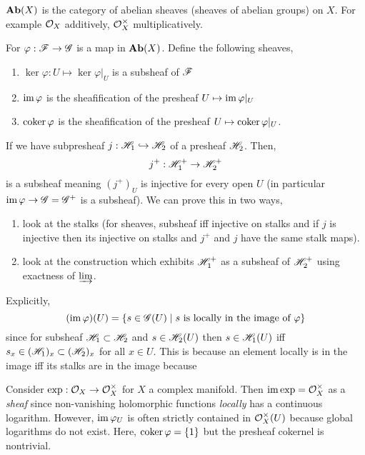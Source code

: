 \documentclass[12pt]{article}
\begin{document}
\begin{defn}
$\mathbf{Ab}(X)$ is the category of abelian sheaves (sheaves of abelian groups) on $X$. For example $\mathcal{O}_{X}$ additively, $\mathcal{O}_{X}^\times$ multiplicatively. 
\end{defn}

\begin{defn}
For $\varphi : \mathscr{F} \to \mathscr{G}$ is a map in $\mathbf{Ab}(X)$. Define the following sheaves,
\begin{enumerate}
\item $\ker{\varphi} : U \mapsto \ker{\varphi|_U}$ is a subsheaf of $\mathscr{F}$
\item $\operatorname{\mathrm{im}}{\varphi}$ is the sheafification of the presheaf $U \mapsto \operatorname{\mathrm{im}}{\varphi|_U}$
\item $\operatorname{\mathrm{coker}}{\varphi}$ is the sheafification of the presheaf $U \mapsto \operatorname{\mathrm{coker}}{\varphi|_U}$.
\end{enumerate}
\end{defn}

\begin{rmk}
If we have subpresheaf $j : \mathscr{H}_1 \hookrightarrow \mathscr{H}_2$ of a presheaf $\mathscr{H}_2$. Then,
\[ j^+ : \mathscr{H}_1^+ \to \mathscr{H}_2^+ \]
is a subsheaf meaning $(j^+)_U$ is injective for every open $U$ (in particular $\operatorname{\mathrm{im}}{\varphi} \to \mathscr{G} = \mathscr{G}^+$ is a subsheaf). We can prove this in two ways,
\begin{enumerate}
\item look at the stalks (for sheaves, subsheaf iff injective on stalks and if $j$ is injective then its injective on stalks and $j^+$ and $j$ have the same stalk maps).
\item look at the construction which exhibits $\mathscr{H}_1^+$ as a subsheaf of $\mathscr{H}_2^+$ using exactness of $\varinjlim$.
\end{enumerate}
\end{rmk}

\begin{rmk}
Explicitly,
\[ (\operatorname{\mathrm{im}}{\varphi})(U) = \{ s \in \mathscr{G}(U) \mid s \text{ is locally in the image of } \varphi \} \]
since for subsheaf $\mathscr{H}_1 \subset \mathscr{H}_2$ and $s \in \mathscr{H}_2(U)$ then $s \in \mathscr{H}_1(U)$ iff $s_x \in (\mathscr{H}_1)_x \subset (\mathscr{H}_2)_x$ for all $x \in U$. This is because an element locally is in the image iff its stalks are in the image because 
\end{rmk}

\begin{example}
Consider $\exp : \mathcal{O}_{X} \to \mathcal{O}_{X}^\times$ for $X$ a complex manifold. Then $\operatorname{\mathrm{im}}{\exp} = \mathcal{O}_{X}^\times$ as a \textit{sheaf} since non-vanishing holomorphic functions \textit{locally} has a continuous logarithm. However, $\operatorname{\mathrm{im}}{\varphi_U}$ is often strictly contained in $\mathcal{O}_{X}^\times(U)$ because global logarithms do not exist. Here, $\operatorname{\mathrm{coker}}{\varphi} = \{ 1 \}$ but the presheaf cokernel is nontrivial. 
\end{example}
\end{document}
